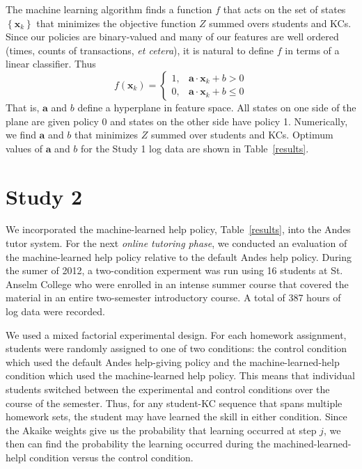 \documentclass{edm_template}
\begin{document}
The machine learning algorithm finds a function $f$ that acts on
the set of states $\left\{\mathbf{x}_k\right\}$ that minimizes
the objective function $Z$ summed overs students and KCs.  
Since our policies are binary-valued
and many of our features are well ordered (times, counts of transactions,
{\em et cetera}), it is natural to define $f$ in terms of a 
linear classifier.  Thus
%
\begin{equation}
              f(\mathbf{x}_k) = \left\{\begin{array}{cc}
		1,& \mathbf{a}\cdot \mathbf{x}_k+b >0 \\
                0, & \mathbf{a}\cdot \mathbf{x}_k +b\le 0
		\end{array} \right. \label{classifier}
\end{equation}
%
That is, $\mathbf{a}$ and $b$ define a hyperplane in feature
space.  All states on one side of the plane are given policy 0
and states on the other side have policy 1.
Numerically, we find $\mathbf{a}$ and $b$ that minimizes $Z$
summed over students and KCs.
Optimum values of  $\mathbf{a}$ and $b$ for the  
Study 1 log data are shown in Table~\ref{results}.

\section{Study 2}

We incorporated the machine-learned help policy,
Table~\ref{results}, into the Andes tutor system.  For the next {\em
  online tutoring phase}, we conducted an evaluation of the
machine-learned help policy relative to the default Andes help policy.
During the sumer of 2012, a two-condition experment was run using 16
students at St. Anselm College who were enrolled in an intense summer
course that covered the material in an entire two-semester introductory course. 
A total of 387 hours of log data were recorded.

We used a mixed factorial experimental design.  For each homework assignment,
students were randomly assigned to one of two conditions:  the control
condition which used the default Andes help-giving policy and the
machine-learned-help condition which used the machine-learned help policy.
This means that individual students switched
between the experimental and control conditions over the course of the
semester.  Thus, for any student-KC sequence that spans multiple
homework sets, the student may have learned the skill in either 
condition.  Since the Akaike weights  give us the probability that 
learning occurred at step $j$, we then can find the probability 
the learning occurred
during the machined-learned-helpl condition versus the control condition.
\end{document}

